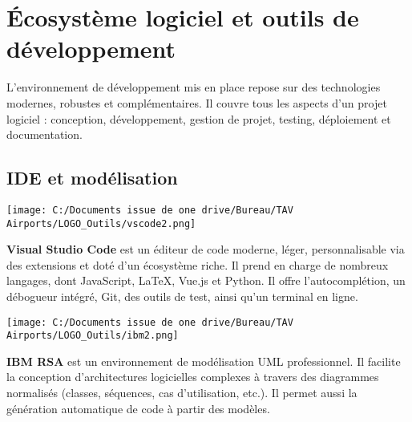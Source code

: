 \documentclass[a4paper,11pt]{report}
\begin{document}
\newpage
\section*{Écosystème logiciel et outils de développement}

L’environnement de développement mis en place repose sur des technologies modernes, robustes et complémentaires. Il couvre tous les aspects d’un projet logiciel : conception, développement, gestion de projet, testing, déploiement et documentation.

\vspace{1em}

\subsection*{IDE et modélisation}

\tcolorbox[title=Visual Studio Code]
\begin{minipage}{0.15\textwidth}
  \texttt{[image: C:/Documents issue de one drive/Bureau/TAV Airports/LOGO\_Outils/vscode2.png]}
\end{minipage}
\hfill
\begin{minipage}{0.8\textwidth}
\textbf{Visual Studio Code} est un éditeur de code moderne, léger, personnalisable via des extensions et doté d’un écosystème riche. Il prend en charge de nombreux langages, dont JavaScript, LaTeX, Vue.js et Python. Il offre l'autocomplétion, un débogueur intégré, Git, des outils de test, ainsi qu’un terminal en ligne.
\end{minipage}
\endtcolorbox

\tcolorbox[title=IBM Rational Software Architect]
\begin{minipage}{0.15\textwidth}
  \texttt{[image: C:/Documents issue de one drive/Bureau/TAV Airports/LOGO\_Outils/ibm2.png]}
\end{minipage}
\hfill
\begin{minipage}{0.8\textwidth}
\textbf{IBM RSA} est un environnement de modélisation UML professionnel. Il facilite la conception d’architectures logicielles complexes à travers des diagrammes normalisés (classes, séquences, cas d’utilisation, etc.). Il permet aussi la génération automatique de code à partir des modèles.
\end{minipage}
\endtcolorbox

\vspace{1em}

\end{document}

